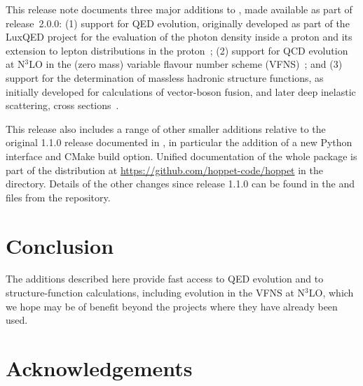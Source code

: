\documentclass[preprint,1p,a4paper,11pt]{elsarticle}
\begin{document}
This release note documents three major additions to \hoppet, made
available as part of release~2.0.0: (1) support for QED evolution,
originally developed as part of the LuxQED project for the evaluation
of the photon density inside a proton and its extension to lepton
distributions in the
proton~\cite{Manohar:2016nzj,Manohar:2017eqh,Buonocore:2020nai,Buonocore:2021bsf};
%
(2) support for QCD evolution at N$^3$LO in the (zero mass) variable
flavour number scheme (VFNS)~\cite{Buza:1996wv};
%
and (3) support for the
determination of massless hadronic structure functions, as initially developed
for calculations of vector-boson fusion, and later deep inelastic scattering, cross
sections~\cite{Cacciari:2015jma,Dreyer:2016oyx,Dreyer:2018qbw,Dreyer:2018rfu,Karlberg:2024hnl}.

This release also includes a range of other smaller additions relative
to the original 1.1.0 release documented in \cite{Salam:2008qg}, in
particular the addition of a new Python interface and CMake build
option.
%
Unified documentation of the whole \hoppet package is part of the
distribution at \url{https://github.com/hoppet-code/hoppet} in the
 directory.
%
Details of the other changes since release 1.1.0 can be found in the
 and  files from the
repository.\medskip

\noindent {}



\section{Conclusion}

The \hoppet additions described here provide fast access to QED
evolution and to structure-function calculations, including evolution
in the VFNS at N$^3$LO, which we hope may be of benefit beyond the
projects where they have already been used.


\section*{Acknowledgements}
\end{document}
